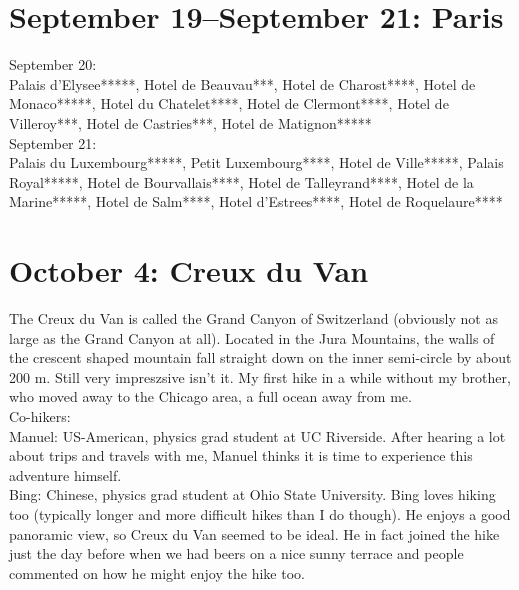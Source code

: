 \section{September 19--September 21: Paris}
\label{Paris2014}

September 20:\\
Palais d'Elysee*****, Hotel de Beauvau***, Hotel de Charost****, Hotel de Monaco*****, Hotel du Chatelet****, Hotel de Clermont****, Hotel de Villeroy***, Hotel de Castries***, Hotel de Matignon*****\\

September 21:\\
Palais du Luxembourg*****, Petit Luxembourg****, Hotel de Ville*****, Palais Royal*****, Hotel de Bourvallais****, Hotel de Talleyrand****, Hotel de la Marine*****, Hotel de Salm****, Hotel d'Estrees****, Hotel de Roquelaure****

\section{October 4: Creux du Van}
\label{Creuxduvan2014}

The Creux du Van is called the Grand Canyon of Switzerland (obviously not as large as the Grand Canyon at all). Located in the Jura Mountains, the walls of the crescent shaped mountain fall straight down on the inner semi-circle by about 200 m. Still very impreszsive isn't it. My first hike in a while without my brother, who moved away to the Chicago area, a full ocean away from me.\\

Co-hikers:\\
Manuel: US-American, physics grad student at UC Riverside. After hearing a lot about trips and travels with me, Manuel thinks it is time to experience this adventure himself.\\
Bing: Chinese, physics grad student at Ohio State University. Bing loves hiking too (typically longer and more difficult hikes than I do though). He enjoys a good panoramic view, so Creux du Van seemed to be ideal. He in fact joined the hike just the day before when we had beers on a nice sunny terrace and people commented on how he might enjoy the hike too.\\

